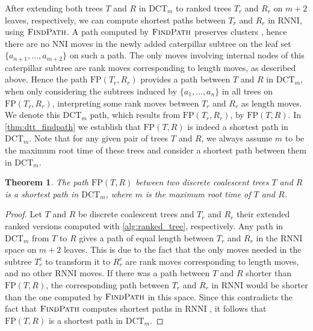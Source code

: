 \documentclass[11pt]{amsart}
\newtheorem{theorem}{Theorem}
\newcommand{\rnni}{\mathrm{RNNI}}
\newcommand{\findpath}{\textsc{FindPath}}
\newcommand{\nni}{\mathrm{NNI}}
\newcommand{\fp}{\mathrm{FP}}
\newcommand{\dtt}{\mathrm{DCT}}
\newcommand{\summary}[1]{} %
\begin{document}
\summary{How to compute shortest $\dtt_m$-paths between trees with $\findpath$}
After extending both trees $T$ and $R$ in $\dtt_m$ to ranked trees $T_r$ and $R_r$ on $m+2$ leaves, respectively, we can compute shortest paths between $T_r$ and $R_r$ in $\rnni$, using $\findpath$.
A path computed by $\findpath$ preserves clusters \autocite{Collienne2020-iu}, hence there are no $\nni$ moves in the newly added caterpillar subtree on the leaf set $\{a_{n+1}, \ldots, a_{m+2}\}$ on such a path.
The only moves involving internal nodes of this caterpillar subtree are rank moves corresponding to length moves, as described above.
Hence the path $\fp(T_r,R_r)$ provides a path between $T$ and $R$ in $\dtt_m$, when only considering the subtrees induced by $\{a_1, \ldots, a_n\}$ in all trees on $\fp(T_r, R_r)$, interpreting some rank moves between $T_r$ and $R_r$ as length moves.
We denote this $\dtt_m$ path, which results from $\fp(T_r, R_r)$, by $\fp(T,R)$.
In \autoref{thm:dtt_findpath} we establish that $\fp(T,R)$ is indeed a shortest path in $\dtt_m$.
Note that for any given pair of trees $T$ and $R$, we always assume $m$ to be the maximum root time of these trees and consider a shortest path between them in $\dtt_m$.

\begin{theorem}
	The path $\fp(T,R)$ between two discrete coalescent trees $T$ and $R$ is a shortest path in $\dtt_m$, where $m$ is the maximum root time of $T$ and $R$.
	\label{thm:dtt_findpath}
\end{theorem}

\begin{proof}
	Let $T$ and $R$ be discrete coalescent trees and $T_r$ and $R_r$ their extended ranked versions computed with \autoref{alg:ranked_tree}, respectively.
	Any path in $\dtt_m$ from $T$ to $R$ gives a path of equal length between $T_r$ and $R_r$ in the $\rnni$ space on $m+2$ leaves.
	This is due to the fact that the only moves needed in the subtree $T_r^c$ to transform it to $R_r^c$ are rank moves corresponding to length moves, and no other $\rnni$ moves.
	If there was a path between $T$ and $R$ shorter than $\fp(T,R)$, the corresponding path between $T_r$ and $R_r$ in $\rnni$ would be shorter than the one computed by $\findpath$ in this space.
	Since this contradicts the fact that $\findpath$ computes shortest paths in $\rnni$ \autocite[Theorem 1]{Collienne2020-iu}, it follows that $\fp(T,R)$ is a shortest path in $\dtt_m$.
\end{proof}
\end{document}
